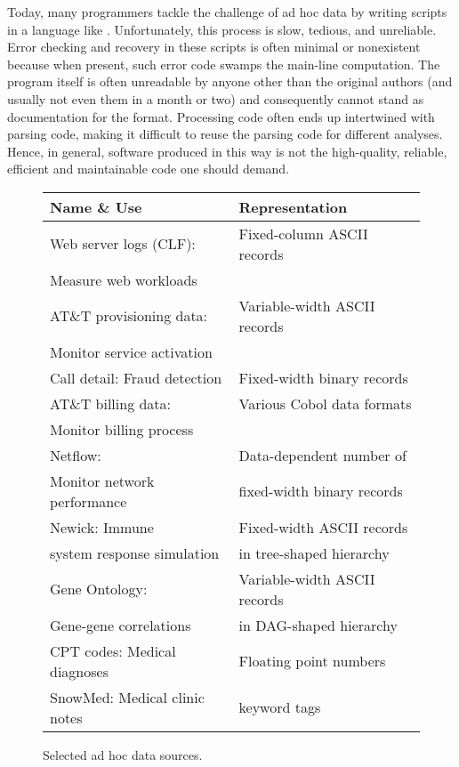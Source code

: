 Today, many programmers tackle the challenge of ad hoc data by writing
scripts in a language like \perl{}.  Unfortunately, this process is slow,
tedious, and unreliable.  Error checking and recovery in these scripts
is often minimal or nonexistent because when present, such error code
swamps the main-line computation.  The program itself is often
unreadable by anyone other than the original authors (and usually not
even them in a month or two) and consequently cannot stand as
documentation for the format.  Processing code often ends up
intertwined with parsing code, making it difficult to reuse the
parsing code for different analyses. Hence, in general, software
produced in this way is not the high-quality, reliable, efficient and
maintainable code one should demand.

\begin{figure}
\begin{center}
\begin{tabular}{|l|l|}
\hline
Name \& Use   &  Representation               \\ \hline\hline
Web server logs (CLF):  &  Fixed-column ASCII records \\ 
Measure web workloads &                             \\ \hline
AT\&T provisioning data: & Variable-width ASCII records  \\ 
Monitor service activation &                              \\ \hline
Call detail: Fraud detection  &  Fixed-width binary records \\  \hline 
AT\&T billing data: & Various Cobol data formats  \\ 
Monitor billing process   &                             \\ \hline
Netflow:                        & Data-dependent number of     \\ 
Monitor network performance  & fixed-width binary records  \\ \hline
Newick:   Immune                 & Fixed-width ASCII records \\ 
system response simulation & in tree-shaped hierarchy\\ \hline                                
Gene Ontology:             & Variable-width ASCII records \\
Gene-gene correlations     & in DAG-shaped hierarchy \\ \hline
CPT codes: Medical diagnoses & Floating point numbers \\ \hline
SnowMed: Medical clinic notes & keyword tags  \\ \hline


\end{tabular}


\caption{Selected ad hoc data sources.}
\label{figure:data-sources}
\end{center}
\end{figure}
 
